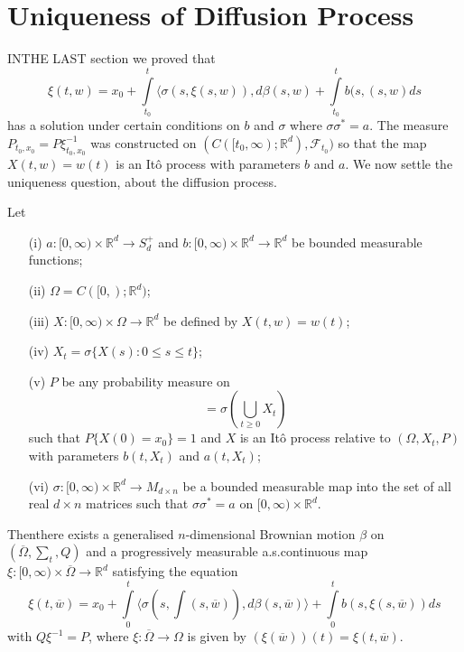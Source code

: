 \chapter{Uniqueness of Diffusion Process}\label{chap26}

IN\pageoriginale THE LAST section we proved that
$$
\xi(t,w)=x_{0}+\int\limits^{t}_{t_{0}}\langle \sigma(s,\xi(s,w)),d\beta(s,w)+\int\limits^{t}_{t_{0}}b(s,(s,w)ds
$$
has a solution under certain conditions on $b$ and $\sigma$ where
$\sigma\sigma^{*}=a$. The measure
$P_{t_{0},x_{0}}=P\xi^{-1}_{t_{0},x_{0}}$ was constructed on
$(C([t_{0},\infty);\mathbb{R}^{d}),\mathscr{F}_{t_{0}})$ so that the
  map $X(t,w)=w(t)$ is an It\^o process with parameters $b$ and
  $a$. We now settle the uniqueness question, about the diffusion
  process. 

\begin{theorem*}
Let
\begin{itemize}
\item[\rm(i)] $a:[0,\infty)\times \mathbb{R}^{d}\to S^{+}_{d}$ and
  $b:[0,\infty)\times \mathbb{R}^{d}\to \mathbb{R}^{d}$ be bounded
    measurable functions;

\item[\rm(ii)] $\Omega=C([0,);\mathbb{R}^{d})$;

\item[\rm(iii)] $X:[0,\infty)\times \Omega\to \mathbb{R}^{d}$ be
  defined by $X(t,w)=w(t)$;

\item[\rm(iv)] $X_{t}=\sigma\{X(s):0\leq s\leq t\}$;

\item[\rm(v)] $P$ be any probability measure on
$$
=\sigma\left(\bigcup\limits_{t\geq 0}X_t\right)
$$
such that $P\{X(0)=x_{0}\}=1$ and $X$ is an It\^o process relative to
$(\Omega,X_{t},P)$ with parameters $b(t,X_{t})$ and $a(t,X_{t})$;

\item[\rm(vi)] $\sigma:[0,\infty)\times \mathbb{R}^{d}\to M_{d\times
    n}$ be a bounded measurable map into the set of all real $d\times n$
  matrices such that $\sigma\sigma^{*}=a$ on
  $[0,\infty)\times\mathbb{R}^{d}$. 
\end{itemize}

Then\pageoriginale there exists a generalised $n$-dimensional
Brownian motion $\beta$ on $(\overline{\Omega},\sum_{t},Q)$ and a
progressively measurable a.s.\@ continuous map
$\xi:[0,\infty)\times\overline{\Omega}\to \mathbb{R}^{d}$ satisfying
  the equation
\begin{equation*}
\xi(t,\overline{w})=x_{0}+\int\limits^{t}_{0}\langle
\sigma(s,\int(s,\overline{w})),d\beta(s,\overline{w})\rangle
+\int\limits^{t}_{0}b(s,\xi(s,\overline{w}))ds\tag{1}\label{chap26-eq1}
\end{equation*}
with $Q\xi^{-1}=P$, where $\xi:\overline{\Omega}\to \Omega$ is given
by $(\xi(\overline{w}))(t)=\xi(t,\overline{w})$. 
\end{theorem*}

